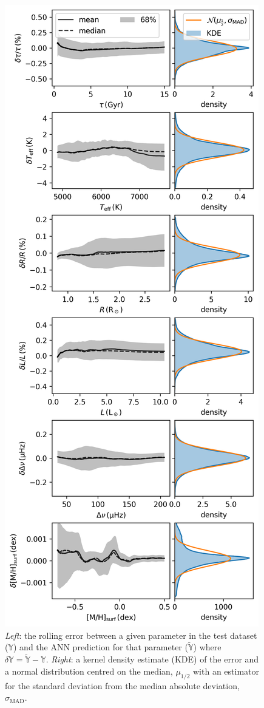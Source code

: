 \documentclass[fleqn,usenatbib]{mnras}
\begin{document}
\begin{figure}
    \centering
    \includegraphics[width=\linewidth]{figures/test_random.png}
    \caption{\emph{Left}: the rolling error between a given parameter in the test dataset ($\mathbb{Y}$) and the ANN prediction for that parameter ($\widetilde{\mathbb{Y}}$) where $\delta \mathbb{Y} = \widetilde{\mathbb{Y}} - \mathbb{Y}$. \emph{Right}: a kernel density estimate (KDE) of the error and a normal distribution centred on the median, $\mu_{1/2}$ with an estimator for the standard deviation from the median absolute deviation, $\sigma_\mathrm{MAD}$.}
    \label{fig:test}
\end{figure}
\end{document}
